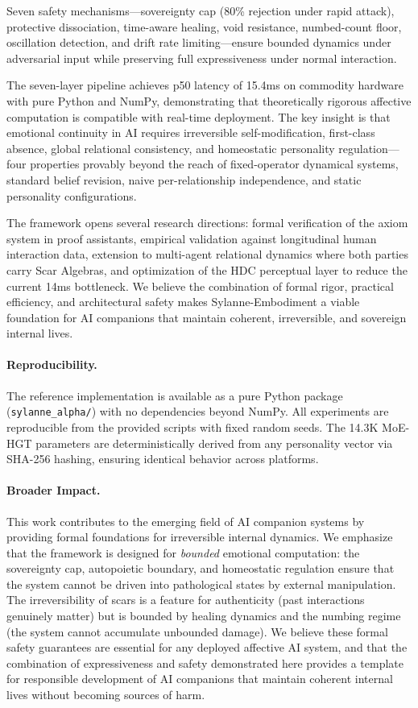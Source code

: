 \documentclass[11pt]{article}
\begin{document}
Seven safety mechanisms---sovereignty cap (80\% rejection under rapid attack), protective dissociation, time-aware healing, void resistance, numbed-count floor, oscillation detection, and drift rate limiting---ensure bounded dynamics under adversarial input while preserving full expressiveness under normal interaction.

The seven-layer pipeline achieves p50 latency of 15.4ms on commodity hardware with pure Python and NumPy, demonstrating that theoretically rigorous affective computation is compatible with real-time deployment. The key insight is that emotional continuity in AI requires irreversible self-modification, first-class absence, global relational consistency, and homeostatic personality regulation---four properties provably beyond the reach of fixed-operator dynamical systems, standard belief revision, naive per-relationship independence, and static personality configurations.

The framework opens several research directions: formal verification of the axiom system in proof assistants, empirical validation against longitudinal human interaction data, extension to multi-agent relational dynamics where both parties carry Scar Algebras, and optimization of the HDC perceptual layer to reduce the current 14ms bottleneck. We believe the combination of formal rigor, practical efficiency, and architectural safety makes Sylanne-Embodiment a viable foundation for AI companions that maintain coherent, irreversible, and sovereign internal lives.

\paragraph{Reproducibility.} The reference implementation is available as a pure Python package (\texttt{sylanne\_alpha/}) with no dependencies beyond NumPy. All experiments are reproducible from the provided scripts with fixed random seeds. The 14.3K MoE-HGT parameters are deterministically derived from any personality vector via SHA-256 hashing, ensuring identical behavior across platforms.

\paragraph{Broader Impact.}
This work contributes to the emerging field of AI companion systems by providing formal foundations for irreversible internal dynamics. We emphasize that the framework is designed for \emph{bounded} emotional computation: the sovereignty cap, autopoietic boundary, and homeostatic regulation ensure that the system cannot be driven into pathological states by external manipulation. The irreversibility of scars is a feature for authenticity (past interactions genuinely matter) but is bounded by healing dynamics and the numbing regime (the system cannot accumulate unbounded damage). We believe these formal safety guarantees are essential for any deployed affective AI system, and that the combination of expressiveness and safety demonstrated here provides a template for responsible development of AI companions that maintain coherent internal lives without becoming sources of harm.
\end{document}

